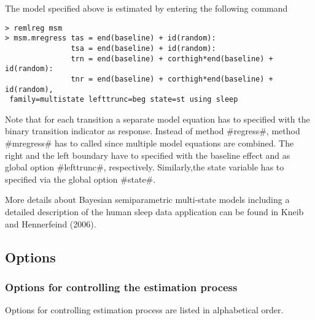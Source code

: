 The model specified above is estimated by entering the following
command

\label{msm_code}
\begin{verbatim}
> remlreg msm
> msm.mregress tas = end(baseline) + id(random):
               tsa = end(baseline) + id(random):
               trn = end(baseline) + corthigh*end(baseline) + id(random):
               tnr = end(baseline) + corthigh*end(baseline) + id(random),
 family=multistate lefttrunc=beg state=st using sleep
\end{verbatim}

Note that for each transition a separate model equation has to
specified with the binary transition indicator as response. Instead
of method #regress#, method #mregress# has to called since multiple
model equations are combined. The right and the left boundary have
to specified with the baseline effect and as global option
#lefttrunc#, respectively. Similarly,the state variable has to
specified via the global option #state#.

More details about Bayesian semiparametric multi-state models
including a detailed description of the human sleep data application
can be found in Kneib and Hennerfeind (2006).


\subsection{Options}
\label{remlregregressoptions}

\subsubsection*{Options for controlling the estimation process}
\label{remlest_options}

Options for controlling estimation process are listed in
alphabetical order.


